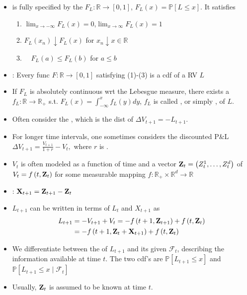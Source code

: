 \begin{itemize}[leftmargin=*]
    \item {} is fully specified by the  $F_{L}: \mathbb{R} \rightarrow[0,1]$, $F_{L}(x)=\mathbb{P}[L \leq x]$. It satisfies
    \begin{enumerate}[label = (\arabic*), leftmargin=*]
        \item {}$\displaystyle\lim _{x \rightarrow-\infty} F_{L}(x)=0$,$\displaystyle\lim _{x \rightarrow \infty} F_{L}(x)=1$
        \item {}$F_{L}\left(x_{n}\right) \downarrow F_{L}(x)$ for $x_{n} \downarrow x \in \mathbb{R}$
        \item {} $\quad F_{L}(a) \leq F_{L}(b)$ for $a \leq b$
    \end{enumerate}
    \item {}: Every func $F: \mathbb{R} \rightarrow[0,1]$ satisfying (1)-(3) is a cdf of a RV $L$
    \item If $F_{L}$ is absolutely continuous wrt the Lebesgue measure, there exists a  $f_{L}: \mathbb{R} \rightarrow \mathbb{R}_{+}$ s.t. $F_{L}(x)=\int_{-\infty}^{x} f_{L}(y) d y$, $f_{L}$ is called , or simply , of $L$.
    \item Often consider the , which is the dist of $\Delta V_{t+1}=-L_{t+1}$.
    \item For longer time intervals, one sometimes considers the discounted P\&L $\Delta V_{t+1}=\frac{V_{t+1}}{1+r}-V_{t},$ where $r$ is .
    \item $V_{t}$ is often modeled as a function of time and a vector $\boldsymbol{\mathbf{Z}}_{t}=\left(Z_{t}^{1}, \ldots, Z_{t}^{d}\right)$ of  $ V_{t}=f\left(t, \boldsymbol{\mathbf{Z}}_{t}\right)$ for some measurable mapping $f: \mathbb{R}_{+} \times \mathbb{R}^{d} \rightarrow \mathbb{R}$
    \item {}: $\boldsymbol{\mathbf{X}}_{t+1}=\boldsymbol{\mathbf{Z}}_{t+1}-\boldsymbol{\mathbf{Z}}_{t}$
    \item $L_{t+1}$ can be written in terms of $L_{t}$ and $X_{t+1}$ as
$$
\begin{aligned}
L_{t+1}&=-V_{t+1}+V_{t}=-f\left(t+1, \boldsymbol{\mathbf{Z}}_{t+1}\right)+f\left(t, \boldsymbol{\mathbf{Z}}_{t}\right)\\
&=-f\left(t+1, \boldsymbol{\mathbf{Z}}_{t}+\boldsymbol{\mathbf{X}}_{t+1}\right)+f\left(t, \boldsymbol{\mathbf{Z}}_{t}\right)
\end{aligned}
$$
    \item We differentiate between the  of $L_{t+1}$ and its  given $\mathcal{F}_{t}$, describing the information available at time $t$. The two cdf's are
$
\mathbb{P}\left[L_{t+1} \leq x\right]$ and $\mathbb{P}\left[L_{t+1} \leq x \mid \mathcal{F}_{t}\right]
$
    \item Usually, $\boldsymbol{\mathbf{Z}}_{t}$ is assumed to be known at time $t$.
\end{itemize}





